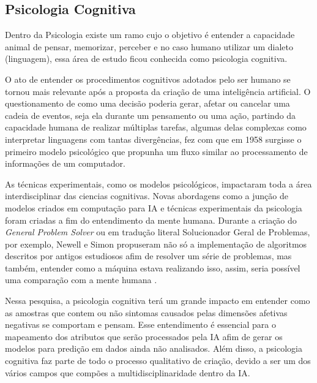 \subsection{Psicologia Cognitiva}
Dentro da Psicologia existe um ramo cujo o objetivo é entender a capacidade animal de pensar, memorizar, perceber e no caso humano utilizar um dialeto (linguagem), essa área de estudo ficou conhecida como psicologia cognitiva. \cite[3-9]{neisser2014cognitive}

O ato de entender os procedimentos cognitivos adotados pelo ser humano se tornou mais relevante após a proposta da criação de uma inteligência artificial. O questionamento de como uma decisão poderia gerar, afetar ou cancelar uma cadeia de eventos, seja ela durante um pensamento ou uma ação, partindo da capacidade humana de realizar múltiplas tarefas, algumas delas complexas como interpretar linguagens com tantas divergências, fez com que em 1958\cite[4-7]{broadbent1958perception} surgisse o primeiro modelo psicológico que propunha um fluxo similar ao processamento de informações de um computador.

As técnicas experimentais, como os modelos psicológicos, impactaram toda a área interdisciplinar das ciencias cognitivas. Novas abordagens como a junção de modelos criados em computação para IA e técnicas experimentais da psicologia foram criadas a fim do entendimento da mente humana. Durante a criação do \textit{General Problem Solver} ou em tradução literal Solucionador Geral de Problemas, por exemplo, Newell e Simon propuseram não só a implementação de algoritmos descritos por antigos estudiosos afim de resolver um série de problemas, mas também, entender como a máquina estava realizando isso, assim, seria possível uma comparação com a mente humana \cite{newell1961gps, russell2003artificial}.

Nessa pesquisa, a psicologia cognitiva terá um grande impacto em entender como as amostras que contem ou não sintomas causados pelas dimensões afetivas negativas se comportam e pensam. Esse entendimento é essencial para o mapeamento dos atributos que serão processados pela IA afim de gerar os modelos para predição em dados ainda não analisados. Além disso, a psicologia cognitiva faz parte de todo o processo qualitativo de criação, devido a ser um dos vários campos que compões a multidisciplinaridade dentro da IA.
